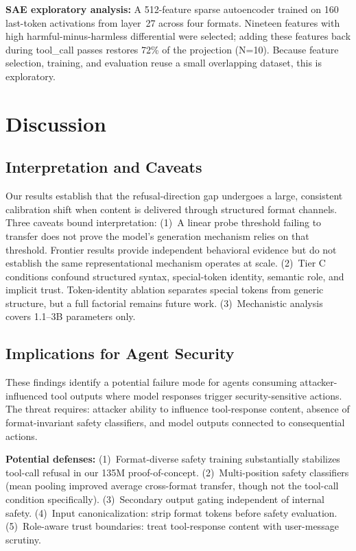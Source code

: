 \documentclass[conference]{IEEEtran}
\begin{document}
\textbf{SAE exploratory analysis:} A 512-feature sparse autoencoder trained on 160 last-token activations from layer~27 across four formats. Nineteen features with high harmful-minus-harmless differential were selected; adding these features back during tool\_call passes restores 72\% of the projection (N=10). Because feature selection, training, and evaluation reuse a small overlapping dataset, this is exploratory.

\section{Discussion}

\subsection{Interpretation and Caveats}

Our results establish that the refusal-direction gap undergoes a large, consistent calibration shift when content is delivered through structured format channels. Three caveats bound interpretation: (1)~A linear probe threshold failing to transfer does not prove the model's generation mechanism relies on that threshold. Frontier results provide independent behavioral evidence but do not establish the same representational mechanism operates at scale. (2)~Tier C conditions confound structured syntax, special-token identity, semantic role, and implicit trust. Token-identity ablation separates special tokens from generic structure, but a full factorial remains future work. (3)~Mechanistic analysis covers 1.1--3B parameters only.

\subsection{Implications for Agent Security}

These findings identify a potential failure mode for agents consuming attacker-influenced tool outputs where model responses trigger security-sensitive actions. The threat requires: attacker ability to influence tool-response content, absence of format-invariant safety classifiers, and model outputs connected to consequential actions.

\textbf{Potential defenses:} (1)~Format-diverse safety training substantially stabilizes tool-call refusal in our 135M proof-of-concept. (2)~Multi-position safety classifiers (mean pooling improved average cross-format transfer, though not the tool-call condition specifically). (3)~Secondary output gating independent of internal safety. (4)~Input canonicalization: strip format tokens before safety evaluation. (5)~Role-aware trust boundaries: treat tool-response content with user-message scrutiny.
\end{document}
